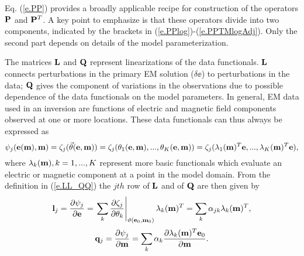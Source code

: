 Eq. (\ref{e.PP}) provides a broadly applicable recipe
for construction of the operators ${\bf P}$ and ${\bf P}^T$.
A key point to emphasize is that these operators divide
into two components, indicated by the brackets in
(\ref{e.PPlog})-(\ref{e.PPTMlogAdj}).  Only the second part
depends on details of the model parameterization.

The matrices ${\bf L}$ and ${\bf Q}$ represent linearizations
of the data functionals.  ${\bf L}$ connects perturbations
in the primary EM solution ($\delta \ee$) to perturbations
in the data; ${\bf Q}$ gives the component of variations in
the observations due to possible dependence of the
data functionals on the model parameters.
In general, EM data used in an inversion are
functions of electric and magnetic field components
observed at one or more locations. These data functionals can thus
always be expressed as
\begin{equation}
\psi_j({\bf e}({\bf m}),{\bf m}) = 
\zeta_j(\vec\theta({\bf e},{\bf m})) =
\zeta_j(\theta_1({\bf e},{\bf m}), ... , \theta_K({\bf e},{\bf m})) =
 \zeta_j(\lambda_1({\bf m})^T {\bf e}, ... , \lambda_K({\bf m})^T {\bf e} ),
\end{equation}
where $\lambda_k({\bf m})  , k = 1, ..., K$
represent more basic functionals which evaluate an electric or
magnetic component at a point in the model domain.
From the definition in (\ref{e.LL_QQ})
the $jth$ row of ${\bf L}$ and of ${\bf Q}$ are then given by
\begin{equation}
\label{e.Lj}
{\bf l}_{j} = \frac{\partial \psi_j}{\partial {\bf e}} = 
\left . \sum_k \frac{\partial \zeta_j}{\partial \theta_k}
\right|_{\vartheta({\bf e}_0,{\bf m}_0)} \lambda_k({\bf m})^T = 
\sum_k \alpha_{jk} \lambda_k({\bf m})^T,
\end{equation}
\begin{equation}
{\bf q}_{j} = \frac{\partial \psi_j}{\partial {\bf m}} = 
\sum_k \alpha_k \frac{\partial \lambda_k({\bf m})^T {\bf e}_0}
{\partial {\bf m}} .
\end{equation}

